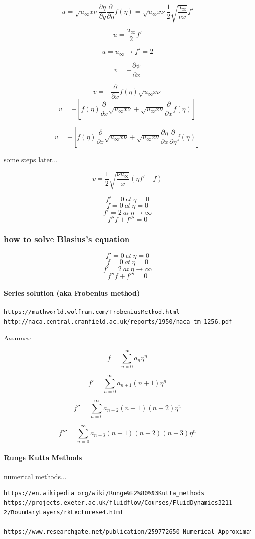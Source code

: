 \documentclass[11pt]{article}
\begin{document}
$$u =\sqrt{u_\infty x \nu} \frac{\partial \eta}{\partial y} \frac{\partial}{\partial \eta} f(\eta)= \sqrt{u_\infty x \nu}  \frac{1}{2} \sqrt{\frac{u_\infty}{\nu x}} f'$$

$$u = \frac{u_\infty}{2} f'$$

$$u = u_\infty \rightarrow f'=2$$



$$v= - \frac{\partial \psi}{\partial x}$$

$$v= - \frac{\partial}{\partial x} f(\eta) \sqrt{u_\infty x \nu}$$
$$v= -[f(\eta)\frac{\partial}{\partial x}  \sqrt{u_\infty x \nu}+  \sqrt{u_\infty x \nu} \frac{\partial}{\partial x} f(\eta)]$$

$$v= -[f(\eta)\frac{\partial}{\partial x}  \sqrt{u_\infty x \nu}+  \sqrt{u_\infty x \nu} \frac{\partial \eta}{\partial x} \frac{\partial}{\partial \eta} f(\eta)]$$

some steps later...

$$v=\frac{1}{2} \sqrt{\frac{\nu u_\infty}{x}}(\eta f' -f)$$

$$f'=0\ at\ \eta=0$$
$$f=0\ at\ \eta=0$$
$$f' =2 \ at \ \eta\rightarrow \infty$$
$$f''f+f'''=0$$

\subsubsection{how to solve Blasius's equation}

$$f'=0\ at\ \eta=0$$
$$f=0\ at\ \eta=0$$
$$f' =2 \ at \ \eta\rightarrow \infty$$
$$f''f+f'''=0$$

\paragraph{Series solution (aka Frobenius method)}

\begin{verbatim}
https://mathworld.wolfram.com/FrobeniusMethod.html
http://naca.central.cranfield.ac.uk/reports/1950/naca-tm-1256.pdf
\end{verbatim}

Assumes:

$$f=\sum_{n=0}^\infty a_n \eta^n$$

$$f'=\sum_{n=0}^\infty a_{n+1} (n+1) \eta^n$$

$$f''=\sum_{n=0}^\infty a_{n+2} (n+1)(n+2) \eta^n$$

$$f'''=\sum_{n=0}^\infty a_{n+3} (n+1)(n+2)(n+3) \eta^n$$

\paragraph{Runge Kutta Methods}
numerical methods...
\begin{verbatim}
https://en.wikipedia.org/wiki/Runge%E2%80%93Kutta_methods 
https://projects.exeter.ac.uk/fluidflow/Courses/FluidDynamics3211-2/BoundaryLayers/rkLecturese4.html

https://www.researchgate.net/publication/259772650_Numerical_Approximations_of_Blasius_Boundary_Layer_Equation
\end{verbatim}
\end{document}
